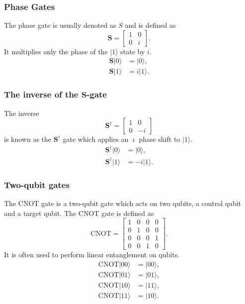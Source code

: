 \documentclass{beamer}
\begin{document}
\begin{frame}
\frametitle{Phase Gates}

The phase gate is usually denoted as $S$ and is defined as
\[
	\bm{S} = \begin{bmatrix}
		1 & 0 \\
		0 & i
	\end{bmatrix}.
\]
It multiplies only the phase of the $ \vert 1\rangle $ state by $ i $.
\begin{align*}
	\bm{S}\vert 0\rangle &= \vert 0\rangle, \\
	\bm{S}\vert 1\rangle &= i\vert 1\rangle.
\end{align*}
\end{frame}

\begin{frame}
\frametitle{The  inverse of the $\bm{S}$-gate}

The inverse
\[
	\bm{S}^\dagger = \begin{bmatrix}
		1 & 0 \\
		0 & -i
	\end{bmatrix}
\]
is known as the $ \bm{S}^\dagger$ gate which applies an $\imath$ phase shift to $\vert 1\rangle$.
\begin{align*}
	\bm{S}^\dagger\vert 0\rangle &= \vert 0\rangle, \\
	\bm{S}^\dagger\vert 1\rangle &= -i\vert 1\rangle.
\end{align*}
\end{frame}

\begin{frame}
\frametitle{Two-qubit gates}

The CNOT gate is a two-qubit gate which acts on two qubits, a control qubit and a target qubit. The CNOT gate is defined as
\[
	\text{CNOT} = \begin{bmatrix}
		1 & 0 & 0 & 0 \\
		0 & 1 & 0 & 0 \\
		0 & 0 & 0 & 1 \\
		0 & 0 & 1 & 0
	\end{bmatrix}.
\]
It is often used to perform linear entanglement on qubits.
\begin{align*}
	\text{CNOT} \vert 00\rangle &= \vert 00\rangle, \\
	\text{CNOT} \vert 01\rangle &= \vert 01\rangle, \\
	\text{CNOT} \vert 10\rangle &= \vert 11\rangle, \\
	\text{CNOT} \vert 11\rangle &= \vert 10\rangle.
\end{align*}
\end{frame}
\end{document}
